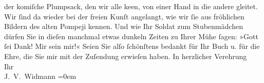 \begin{ledgroupsized}[t]{13cm}
               der komiſche Plumpsack, den wir alle ke{\geminationn}en, von einer
               Hand in die andere gleitet. Wir ſind da wieder bei der freien Kunſt angelangt, wie
               wir ſie aus fröhlichen Bildern des alten Pompeji
               kennen. Und wie Ihr Soldat zum
                  Stubenmädchen dürfen Sie in
               dieſen manchmal {\pb}etwas
               dunkeln Zeiten zu Ihrer Mühe ſagen: »Gott ſei Dank! Mir sein mir!«\pend
           \pstart
           Seien Sie alſo ſchönſtens bedankt für Ihr Buch u. für die Ehre, die Sie mir mit der Zuſendung erwieſen
               haben.\pend
           \pstart
           In herzlicher Verehrung{\\[\baselineskip]}Ihr{\\[\baselineskip]}\spacefill\mbox{J. V. Widmann}\pend
           \leftskip=0em{}
         
         \endnumbering{}\end{ledgroupsized}  \newcommand{\dateiname}{L01044}\newcommand{\titel}{Joseph Victor Widmann an Arthur Schnitzler, 28. 5. 1900}\newcommand{\editorInnen}{Martin Anton Müller und Gerd-Hermann Susen}
      